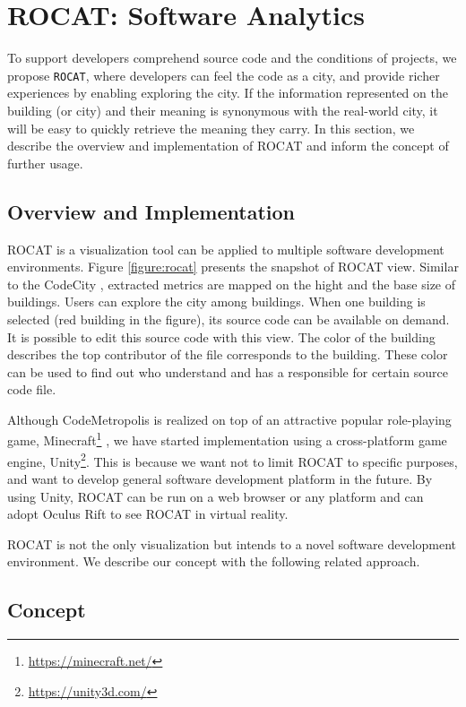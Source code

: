 \documentclass[conference]{IEEEtran}
\newcommand{\figref}[1]{Figure \ref{#1}}
\begin{document}
\section{ROCAT: Software Analytics}
To support developers comprehend source code and the conditions of projects, we propose \texttt{ROCAT}, where developers can feel the code as a city, and provide richer experiences by enabling exploring the city.
If the information represented on the building (or city) and their meaning is synonymous with the real-world city, it will be easy to quickly retrieve the meaning they carry.
In this section, we describe the overview and implementation of ROCAT and inform the concept of further usage.

\subsection{Overview and Implementation}
ROCAT is a visualization tool can be applied to multiple software development environments.
\figref{figure:rocat} presents the snapshot of ROCAT view.
Similar to the CodeCity \cite{Wettel:2011:SSC:1985793.1985868}, extracted metrics are mapped on the hight and the base size of buildings.
Users can explore the city among buildings.
When one building is selected (red building in the figure), its source code can be available on demand.
It is possible to edit this source code with this view.
The color of the building describes the top contributor of the file corresponds to the building.
These color can be used to find out who understand and has a responsible for certain source code file.

Although CodeMetropolis is realized on top of an attractive popular role-playing game, Minecraft\footnote{\url{https://minecraft.net/}} \cite{6648194}, we have started implementation using a cross-platform game engine, Unity\footnote{\url{https://unity3d.com/}}.
This is because we want not to limit ROCAT to specific purposes, and want to develop general software development platform in the future.
By using Unity, ROCAT can be run on a web browser or any platform and can adopt Oculus Rift to see ROCAT in virtual reality.

ROCAT is not the only visualization but intends to a novel software development environment.
We describe our concept with the following related approach.


\subsection{Concept}
\end{document}
